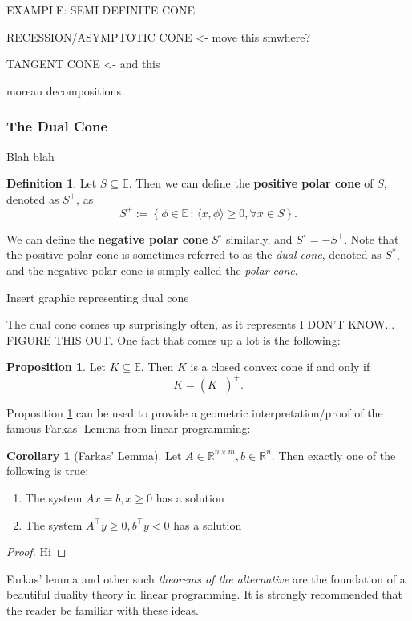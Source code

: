 \documentclass[11pt]{article}
\numberwithin{equation}{section}
\theoremstyle{definition}
\newtheorem{corollary}[theorem]{Corollary}
\newtheorem{proposition}[theorem]{Proposition}
\newtheorem{definition}[theorem]{Definition}%
\newcommand{\bE}{\mathbb{E}}
\newcommand{\bR}{\mathbb{R}}
\newcommand{\set}[2]{\left\{#1\,:\,#2\right\}}
\begin{document}
EXAMPLE: SEMI DEFINITE CONE

RECESSION/ASYMPTOTIC CONE <- move this smwhere?

TANGENT CONE <- and this

moreau decompositions

\subsubsection{The Dual Cone}
Blah blah
\begin{definition}
    Let $S\subseteq\bE$. Then we can define the \textbf{positive polar cone} of $S$, denoted as $S^+$, as
    \begin{equation}
        S^+:=\set{\phi\in\bE}{\langle x,\phi\rangle\ge 0,\forall x\in S}.
    \end{equation}
\end{definition}
We can define the \textbf{negative polar cone} $S^\circ $ similarly, and $S^\circ=-S^+$. Note that the positive polar cone is sometimes referred to as the \textit{dual cone}, denoted as $S^*$, and the negative polar cone is simply called the \textit{polar cone}.

Insert graphic representing dual cone

The dual cone comes up surprisingly often, as it represents I DON'T KNOW... FIGURE THIS OUT. One fact that comes up a lot is the following:
\begin{proposition}
    \label{prpccciffselfdual}
    Let $K\subseteq\bE$. Then $K$ is a closed convex cone if and only if
    \begin{equation}
        K=(K^+)^+.
    \end{equation}
\end{proposition}
Proposition \ref{prpccciffselfdual} can be used to provide a geometric interpretation/proof of the famous Farkas' Lemma from linear programming:
\begin{corollary}[Farkas' Lemma]
    Let $A\in\bR^{n\times m}, b\in\bR^n$. Then exactly one of the following is true:
    \begin{enumerate}[label=(\roman*)]
        \item The system $Ax=b, x\ge 0$ has a solution
        \item The system $A^\top y\ge 0, b^\top y<0$ has a solution
    \end{enumerate}
\end{corollary}
\begin{proof}
Hi
\end{proof}
Farkas' lemma and other such \textit{theorems of the alternative} are the foundation of a beautiful duality theory in linear programming. It is strongly recommended that the reader be familiar with these ideas.
\end{document}
